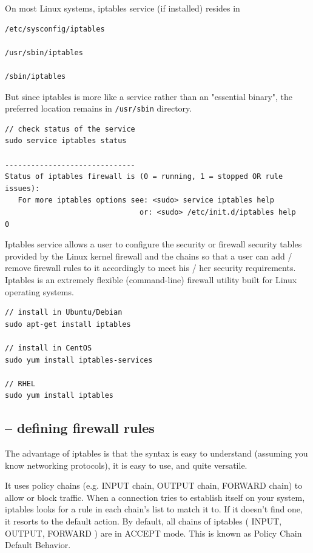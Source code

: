 On most Linux systems, iptables service (if installed) resides in 
\begin{verbatim}
/etc/sysconfig/iptables

/usr/sbin/iptables

/sbin/iptables
\end{verbatim}
But since iptables is more like a service rather than an "essential binary", the
preferred location remains in \verb!/usr/sbin! directory.  

\begin{verbatim}
// check status of the service
sudo service iptables status

------------------------------
Status of iptables firewall is (0 = running, 1 = stopped OR rule issues):
   For more iptables options see: <sudo> service iptables help
                               or: <sudo> /etc/init.d/iptables help
0
\end{verbatim}

Iptables service allows a user to configure the security or firewall security
tables provided by the Linux kernel firewall and the chains so that a user can
add / remove firewall rules to it accordingly to meet his / her security
requirements. Iptables is an extremely flexible (command-line) firewall utility
built for Linux operating systems.
\begin{verbatim}
// install in Ubuntu/Debian
sudo apt-get install iptables

// install in CentOS
sudo yum install iptables-services

// RHEL
sudo yum install iptables
\end{verbatim}


\subsection{-- defining firewall rules}

The advantage of iptables is that the syntax is easy to understand (assuming you
know networking protocols), it is easy to use, and quite versatile.

It uses policy chains (e.g. INPUT chain, OUTPUT chain, FORWARD chain) to allow
or block traffic. When a connection tries to establish itself on your system,
iptables looks for a rule in each chain's list to match it to. If it doesn't
find one, it resorts to the default action.
By default, all chains of iptables ( INPUT, OUTPUT, FORWARD ) are in ACCEPT
mode. This is known as Policy Chain Default Behavior.

